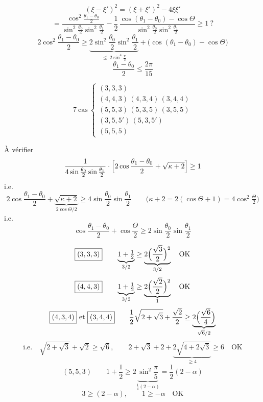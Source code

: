 \documentclass[11pt,a4paper]{article}
\begin{document}
\[
(\xi - \xi')^2 = (\xi + \xi')^2 - 4\xi\xi'
\]
\[
= \frac{\cos^2\frac{\theta_1 - \theta_0}{2}}
{\sin^2\frac{\theta_0}{2}\sin^2\frac{\theta_1}{2}}
- \frac{1}{2}\,\frac{\cos(\theta_1 - \theta_0) - \cos\Theta}
{\sin^2\frac{\theta_0}{2}\sin^2\frac{\theta_1}{2}} \geq 1\ ?
\]
\[
2\cos^2\frac{\theta_1 - \theta_0}{2} \geq
\underbrace{2\sin^2\frac{\theta_0}{2}\sin^2\frac{\theta_1}{2}}_{\leq\ 2\sin^4\frac{\pi}{3}}
+ \bigl(\cos(\theta_1 - \theta_0) - \cos\Theta\bigr)
\]
\[
\frac{\theta_1 - \theta_0}{2} \leq \frac{2\pi}{15}
\]

\[
7\ \text{cas}\ \left\lbrace
\begin{array}{l}
(3,3,3) \\
(4,4,3)\,(4,3,4)\,(3,4,4) \\
(5,5,3)\,(5,3,5)\,(3,5,5) \\
(3,5,5')\,(5,3,5') \\
(5,5,5)
\end{array}\right.
\]

À vérifier
\[
\frac{1}{4\sin\frac{\theta_0}{2}\sin\frac{\theta_1}{2}}
\cdot\Bigl[2\cos\frac{\theta_1 - \theta_0}{2} + \sqrt{\kappa + 2}\Bigr] \geq 1
\]
i.e.
\[
2\cos\frac{\theta_1 - \theta_0}{2}
+ \underbrace{\sqrt{\kappa + 2}}_{2\cos\Theta/2}
\geq 4\sin\frac{\theta_0}{2}\sin\frac{\theta_1}{2}
\qquad \bigl(\kappa + 2 = 2(\cos\Theta + 1) = 4\cos^2\tfrac{\Theta}{2}\bigr)
\]
i.e.
\[
\boxed{\cos\frac{\theta_1 - \theta_0}{2} + \cos\frac{\Theta}{2}
\geq 2\sin\frac{\theta_0}{2}\sin\frac{\theta_1}{2}}
\]

\[
\boxed{(3,3,3)}\qquad
\underbrace{1 + \tfrac{1}{2}}_{3/2} \geq
\underbrace{2\Bigl(\frac{\sqrt{3}}{2}\Bigr)^2}_{3/2}\quad \text{OK}
\]
\[
\boxed{(4,4,3)}\qquad
\underbrace{1 + \tfrac{1}{2}}_{3/2} \geq
\underbrace{2\Bigl(\frac{\sqrt{2}}{2}\Bigr)^2}_{1}\quad \text{OK}
\]
\[
\boxed{(4,3,4)}\ \text{et}\ \boxed{(3,4,4)}\qquad
\frac{1}{2}\sqrt{2 + \sqrt{3}} + \frac{\sqrt{2}}{2}
\geq \underbrace{2\Bigl(\frac{\sqrt{6}}{4}\Bigr)}_{\sqrt{6}/2}
\]
\[
\text{i.e.}\quad \sqrt{2 + \sqrt{3}} + \sqrt{2} \geq \sqrt{6},\qquad
2 + \sqrt{3} + 2 + \underbrace{2\sqrt{4 + 2\sqrt{3}}}_{\geq 4} \geq 6
\quad \text{OK}
\]
\[
\boxed{(5,5,3)}\qquad
1 + \frac{1}{2} \geq
2\underbrace{\sin^2\frac{\pi}{5}}_{\frac{1}{4}(2 - \alpha)}
= \frac{1}{2}(2 - \alpha)
\]
\[
3 \geq (2 - \alpha),\qquad 1 \geq -\alpha\quad \text{OK}
\]
\end{document}
